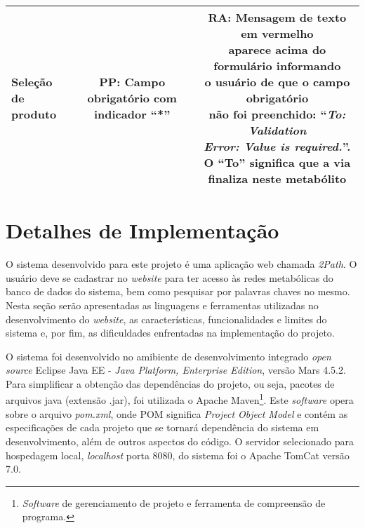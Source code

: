\begin{table}
\begin{tabular}{|l|c|c|}
\specialcell{Seleção de\\produto} & \specialcell{PP: Campo obrigatório com\\indicador ``*''} & \specialcell{RA: Mensagem de texto em vermelho \\aparece acima do formulário informando\\o usuário de que o campo obrigatório\\não foi preenchido: ``\textit{To: Validation}\\\textit{Error: Value is required.}''.\\O ``To'' significa que a via\\finaliza neste metabólito} \\ \hline
\end{tabular}
\end{table}


\section{Detalhes de Implementação}


\indent O sistema desenvolvido para este projeto é uma aplicação web chamada \textit{2Path}. O usuário deve se cadastrar no \textit{website} para ter acesso às redes metabólicas do banco de dados do sistema, bem como pesquisar por palavras chaves no mesmo. Nesta seção serão apresentadas as linguagens e ferramentas utilizadas no desenvolvimento do \textit{website}, as características, funcionalidades e limites do sistema e, por fim, as dificuldades enfrentadas na implementação do projeto.

\indent O sistema foi desenvolvido no amibiente de desenvolvimento integrado \textit{open source} Eclipse Java EE - \textit{Java Platform, Enterprise Edition}, versão Mars 4.5.2. Para simplificar a obtenção das dependências do projeto, ou seja, pacotes de arquivos java (extensão .jar), foi utilizada o Apache Maven\footnote{\textit{Software} de gerenciamento de projeto e ferramenta de compreensão de programa.}. Este \textit{software} opera sobre o arquivo \textit{pom.xml}, onde POM significa \textit{Project Object Model} e contém as especificações de cada projeto que se tornará dependência do sistema em desenvolvimento, além de outros aspectos do código. O servidor selecionado para hospedagem local, \textit{localhost} porta 8080, do sistema foi o Apache TomCat versão 7.0.

